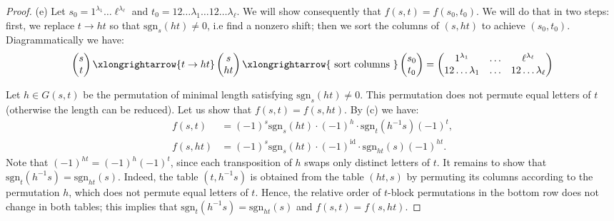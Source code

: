 \documentclass[12pt, reqno]{amsart}
\theoremstyle{definition}
\newcommand{\sgn}{\mathrm{sgn}}
\begin{document}
\begin{proof}
    \vspace{0.5em}

    (e) Let $s_0 = 1^{\lambda_1}\ldots \ell^{\lambda_\ell}$ and $t_0 = 12\ldots\lambda_1\ldots12\ldots\lambda_\ell$. 
    We will show consequently that $f(s,t) = f(s_0, t_0)$. We will do that in two steps: first, we replace $t \to ht$ so that $\sgn_s(ht) \neq 0$, i.e find a nonzero shift; then we sort the columns of $(s,ht)$ to achieve $(s_0, t_0)$. Diagrammatically we have:
    $$
        \begin{pmatrix}
            s\\
            t
        \end{pmatrix} 
        \xlongrightarrow{t \to ht}
        \begin{pmatrix}
            s\\
            ht
        \end{pmatrix} 
        \xlongrightarrow{\text{ sort columns }}
        \begin{pmatrix}
            s_0\\
            t_0
        \end{pmatrix} = 
        \begin{pmatrix}
            1^{\lambda_1}& \ldots & \ell^{\lambda_\ell}\\
            12\ldots\lambda_1&\ldots& 12\ldots\lambda_\ell
        \end{pmatrix}
    $$
    
    Let $h \in G(s,t)$ be the permutation of minimal length satisfying $\sgn_s(ht) \neq 0$. This permutation does not permute equal letters of $t$ (otherwise the length can be reduced). %
    Let us show that $f(s,t) = f(s, ht)$. By (c) we have:
    \begin{align*}
        f(s,t) &= (-1)^s\sgn_s(ht) \cdot (-1)^h \cdot \sgn_t(h^{-1} s) (-1)^t,\\ 
        f(s,ht) &= (-1)^s \sgn_s(ht) \cdot (-1)^{\mathrm{id}} \cdot \sgn_{ht}(s) (-1)^{ht}.
    \end{align*}
    Note that $(-1)^{ht} = (-1)^h (-1)^t$, since each transposition of $h$ swaps only distinct letters of $t$. It remains to show that $\sgn_t(h^{-1} s) = \sgn_{ht}(s)$. Indeed, the table $(t, h^{-1}s)$ is obtained from the table $(ht, s)$ by permuting its columns according to the permutation $h$, which does not permute equal letters of $t$. Hence, the relative order %
    of $t$-block permutations in the bottom row does not change in both tables; this implies that $\sgn_t(h^{-1} s) = \sgn_{ht}(s)$ and $f(s,t) = f(s,ht)$.


\end{proof}
\end{document}
